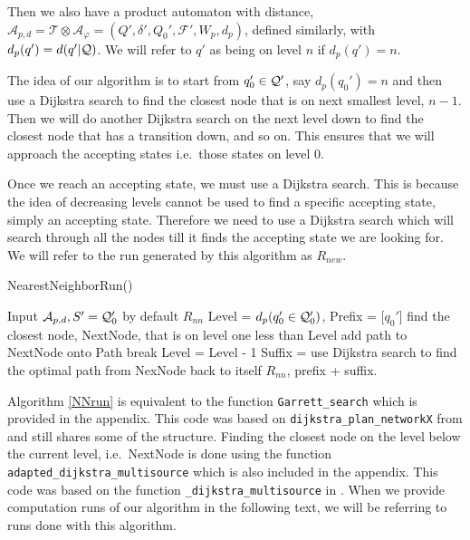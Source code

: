 Then we also have a product automaton with distance, $\mathcal{A}_{p,d} = \mathcal{T} \otimes \mathcal{A}_\varphi = (Q', \delta', Q_0', \mathcal{F}', W_p, d_p)$, defined similarly, with $d_p(q') = d(q'|\mathcal{Q})$. We will refer to $q'$ as being on level $n$ if $d_p(q') = n$.

The idea of our algorithm is to start from $q_0' \in \mathcal{Q}'$, say $d_p(q_0')=n$ and then use a Dijkstra search to find the closest node that is on next smallest level, $n-1$. Then we will do another Dijkstra search on the next level down to find the closest node that has a transition down, and so on. This ensures that we will approach the accepting states i.e.\ those states on level 0. 

Once we reach an accepting state, we must use a Dijkstra search. This is because the idea of decreasing levels cannot be used to find a specific accepting state, simply an accepting state. Therefore we need to use a Dijkstra search which will search through all the nodes till it finds the accepting state we are looking for. We will refer to the run generated by this algorithm as $R_{new}$.
\begin{algorithm}
\caption{NearestNeighborRun()}\label{NNrun}
\begin{algorithmic}[1]
\Require Input $\mathcal{A}_{p,d}, S' = \mathcal{Q}_0'$ by default
\Ensure $R_{nn}$
\State Level = $d_p(q_0' \in \mathcal{Q}_0')$, Prefix = [$q_0'$]
\State find the closest node, NextNode, that is on level one less than Level %
\State	add path to NextNode onto Path
\State break
\EndIf
\State Level = Level - 1	
\EndWhile
\State Suffix = use Dijkstra search to find the optimal path from NexNode back to itself %
\State $R_{nn}$, prefix + suffix.
\end{algorithmic}
\end{algorithm}

Algorithm \ref{NNrun} is equivalent to the function \texttt{Garrett\_search} which is provided in the appendix. This code was based on \texttt{dijkstra\_plan\_networkX} from \cite{pMasGit} and still shares some of the structure. Finding the closest node on the level below the current level, i.e.\ NextNode is done using the function \texttt{adapted\_dijkstra\_multisource} which is also included in the appendix. This code was based on the function  \texttt{\_dijkstra\_multisource} in \cite{schult08}. When we provide computation runs of our algorithm in the following text, we will be referring to runs done with this algorithm. %

